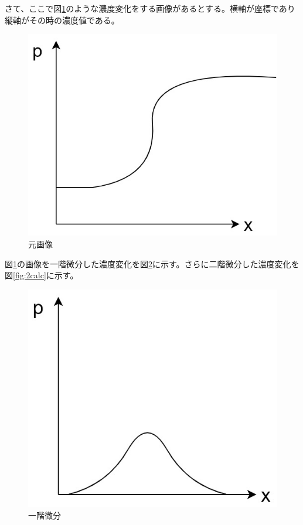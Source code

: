 \documentclass[11pt,a4paper,titlepage,dvipdfmx]{jarticle}
\begin{document}
    さて、ここで図\ref{fig:original}のような濃度変化をする画像があるとする。横軸が座標であり縦軸がその時の濃度値である。
    \begin{figure}[H]
     \centering
     \includegraphics[scale=.7]{original.jpg} 
     \caption{元画像}
     \label{fig:original}
    \end{figure}
    図\ref{fig:original}の画像を一階微分した濃度変化を図\ref{fig:1calc}に示す。さらに二階微分した濃度変化を図\ref{fig:2calc}に示す。
    \begin{figure}[H]
     \centering
     \includegraphics[scale=.7]{1calc.jpg} 
     \caption{一階微分}
     \label{fig:1calc}
    \end{figure}
\end{document}
